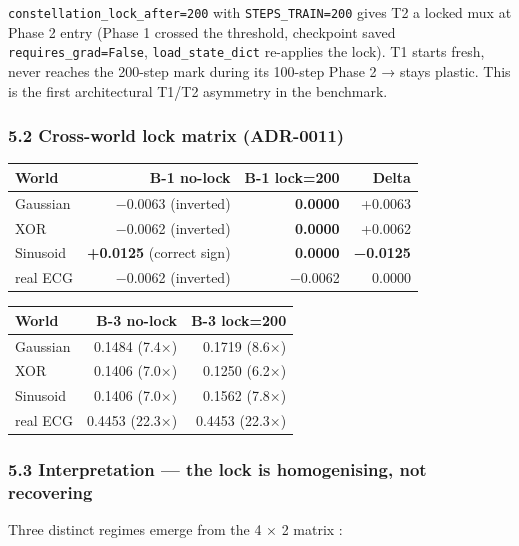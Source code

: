 \documentclass[
]{article}
\newcounter{none} %
\begin{document}
\texttt{constellation\_lock\_after=200} with \texttt{STEPS\_TRAIN=200}
gives T2 a locked mux at Phase 2 entry (Phase 1 crossed the threshold,
checkpoint saved \texttt{requires\_grad=False},
\texttt{load\_state\_dict} re-applies the lock). T1 starts fresh, never
reaches the 200-step mark during its 100-step Phase 2 → stays plastic.
This is the first architectural T1/T2 asymmetry in the benchmark.

\subsubsection{5.2 Cross-world lock matrix
(ADR-0011)}\label{52-cross-world-lock-matrix-adr-0011}

{\def\LTcaptype{none} %
\begin{longtable}[]{@{}lrrr@{}}
\toprule\noalign{}
World & B-1 no-lock & B-1 lock=200 & Delta \\
\midrule\noalign{}
\endhead
\bottomrule\noalign{}
\endlastfoot
Gaussian & −0.0063 (inverted) & \textbf{0.0000} & +0.0063 \\
XOR & −0.0062 (inverted) & \textbf{0.0000} & +0.0062 \\
Sinusoid & \textbf{+0.0125} (correct sign) & \textbf{0.0000} &
\textbf{−0.0125} \\
real ECG & −0.0062 (inverted) & −0.0062 & 0.0000 \\
\end{longtable}
}

{\def\LTcaptype{none} %
\begin{longtable}[]{@{}lrr@{}}
\toprule\noalign{}
World & B-3 no-lock & B-3 lock=200 \\
\midrule\noalign{}
\endhead
\bottomrule\noalign{}
\endlastfoot
Gaussian & 0.1484 (7.4×) & 0.1719 (8.6×) \\
XOR & 0.1406 (7.0×) & 0.1250 (6.2×) \\
Sinusoid & 0.1406 (7.0×) & 0.1562 (7.8×) \\
real ECG & 0.4453 (22.3×) & 0.4453 (22.3×) \\
\end{longtable}
}

\subsubsection{5.3 Interpretation --- the lock is homogenising, not
recovering}\label{53-interpretation--the-lock-is-homogenising-not-recovering}

Three distinct regimes emerge from the 4 × 2 matrix :
\end{document}
